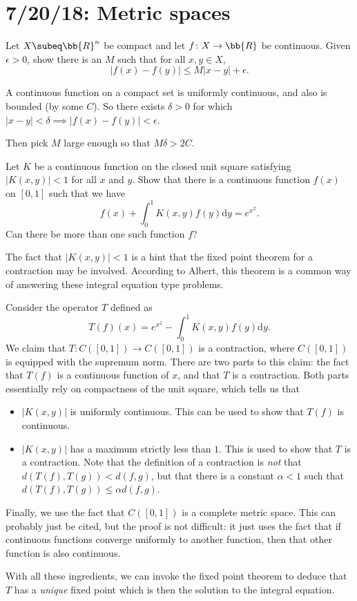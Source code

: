 \section{7/20/18: Metric spaces}
\begin{problem}
	Let $X \subeq \bb{R}^n$ be compact and let $f\colon X\to \bb{R}$ be continuous. Given $\epsilon > 0$, show there is an $M$ such that for all $x,y\in X$,
	\[
		|f(x) - f(y)|\leq M|x-y|+\epsilon.
	\]
\end{problem}
\begin{solution}
	A continuous function on a compact set is uniformly continuous, and also is bounded (by some $C$). So there exists $\delta > 0$ for which $|x-y| < \delta \implies |f(x)-f(y)|<\epsilon$.
	
	Then pick $M$ large enough so that $M\delta > 2C$. 
\end{solution}

\begin{problem}
	Let $K$ be a continuous function on the closed unit square satisfying $|K(x,y)|<1$ for all $x$ and $y$. Show that there is a continuous function $f(x)$ on $[0,1]$ such that we have
	\[
		f(x) + \int_0^1 K(x,y)f(y) \mathrm{d} y = e^{x^2}.
	\]
	Can there be more than one such function $f$?
\end{problem}
\begin{solution}
	The fact that $|K(x,y)|<1$ is a hint that the fixed point theorem for a contraction may be involved. According to Albert, this theorem is a common way of answering these integral equation type problems.
	
	Consider the operator $T$ defined as
	\[
		T(f)(x) = e^{x^2} - \int_0^1 K(x,y)f(y) \mathrm{d} y.
	\]
	We claim that $T\colon C([0,1]) \to C([0,1])$ is a contraction, where $C([0,1])$ is equipped with the supremum norm. There are two parts to this claim: the fact that $T(f)$ is a continuous function of $x$, and that $T$ is a contraction. Both parts essentially rely on compactness of the unit square, which tells us that
	\begin{itemize}
		\item $|K(x,y)|$ is uniformly continuous. This can be used to show that $T(f)$ is continuous.
		\item $|K(x,y)|$ has a maximum strictly less than $1$. This is used to show that $T$ is a contraction. Note that the definition of a contraction is \emph{not} that $d(T(f),T(g)) < d(f,g)$, but that there is a constant $\alpha <1$ such that $d(T(f),T(g)) \leq \alpha d(f,g)$.
	\end{itemize}
	Finally, we use the fact that $C([0,1])$ is a complete metric space. This can probably just be cited, but the proof is not difficult: it just uses the fact that if continuous functions converge uniformly to another function, then that other function is also continuous.
	
	With all these ingredients, we can invoke the fixed point theorem to deduce that $T$ has a \emph{unique} fixed point which is then the solution to the integral equation.
\end{solution}

